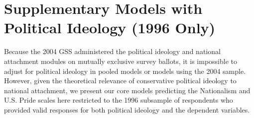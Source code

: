\documentclass[12pt,letterpaper]{article}
\begin{document}
\clearpage
 

\newpage
\appendix
\section{Supplementary Models with Political Ideology (1996 Only)}

Because the 2004 GSS administered the political ideology and national attachment modules on mutually exclusive survey ballots, it is impossible to adjust for political ideology in pooled models or models using the 2004 sample. However, given the theoretical relevance of conservative political ideology to national attachment, we present our core models predicting the Nationalism and U.S. Pride scales here restricted to the 1996 subsample of respondents who provided valid responses for both political ideology and the dependent variables.
\end{document}
